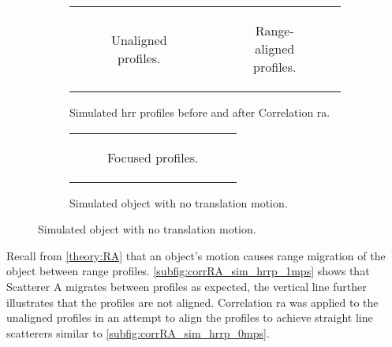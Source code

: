 \documentclass[class=report,11pt,crop=false]{standalone}
\begin{document}
    \begin{figure}[h]
        \begin{minipage}{0.60\linewidth}
            \begin{figure}
                \begin{tabular}{@{}cc@{}}
                    \begin{subfigure}{0.5\linewidth}
                        \centering
                        \resizebox{\linewidth}{!}{}
                        \caption{Unaligned profiles.}\label{subfig:corrRA_sim_hrrp_1mps}
                    \end{subfigure}
                    &
                    \begin{subfigure}{0.5\linewidth}
                        \centering
                        \resizebox{\linewidth}{!}{}
                        \caption{Range-aligned profiles.}\label{subfig:corrRA_sim_hrrp}
                    \end{subfigure}
                \end{tabular}
                \caption{Simulated \gls{hrr} profiles before and after Correlation \gls{ra}. \label{fig:corrRA_sim}}
            \end{figure}
        \end{minipage}
        \hfill
        \begin{minipage}{0.30\linewidth}
            \begin{figure}
                \begin{tabular}{@{}c@{}}
                    \begin{subfigure}{\linewidth}
                        \centering
                        \resizebox{\linewidth}{!}{}
                        \caption{Focused profiles.\label{subfig:corrRA_sim_hrrp_0mps}}
                    \end{subfigure}
                \end{tabular}
                \caption{Simulated object with no translation motion.} \label{fig:sim_0mps}
            \end{figure}
        \end{minipage}
    \end{figure}
    
    Recall from \autoref{theory:RA} that an object's motion causes range migration of the object between range profiles. \autoref{subfig:corrRA_sim_hrrp_1mps} shows that Scatterer A migrates between profiles as expected, the vertical line further illustrates that the profiles are not aligned. Correlation \gls{ra} was applied to the unaligned profiles in an attempt to align the profiles to achieve straight line scatterers similar to \autoref{subfig:corrRA_sim_hrrp_0mps}.
\end{document}
